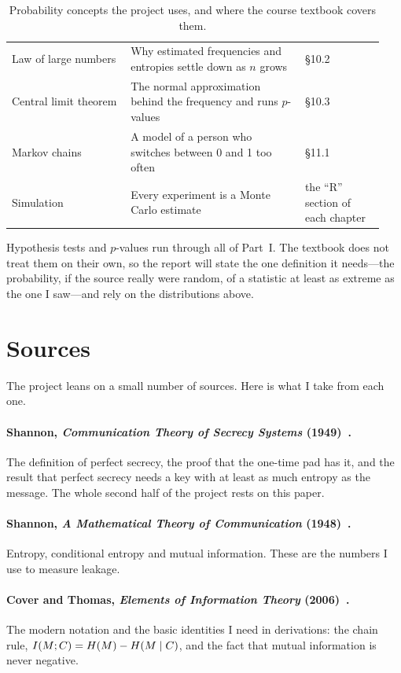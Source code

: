 \begin{table}[htbp]
\begin{tabular}{@{}>{\raggedright\arraybackslash}p{0.30\linewidth}>{\raggedright\arraybackslash}p{0.44\linewidth}>{\raggedright\arraybackslash}p{0.20\linewidth}@{}}
    Law of large numbers
      & Why estimated frequencies and entropies settle down as $n$ grows
      & \S10.2 \\
    Central limit theorem
      & The normal approximation behind the frequency and runs $p$-values
      & \S10.3 \\
    Markov chains
      & A model of a person who switches between 0 and 1 too often
      & \S11.1 \\
    Simulation
      & Every experiment is a Monte Carlo estimate
      & the ``R'' section of each chapter \\
    \bottomrule
  \end{tabular}
  \caption{Probability concepts the project uses, and where the course
    textbook covers them.}
  \label{tab:topics}
\end{table}

Hypothesis tests and $p$-values run through all of Part~I. The textbook does
not treat them on their own, so the report will state the one definition it
needs---the probability, if the source really were random, of a statistic at
least as extreme as the one I saw---and rely on the distributions above.

\section{Sources}\label{sec:sources}

The project leans on a small number of sources. Here is what I take from
each one.

\paragraph{Shannon, \emph{Communication Theory of Secrecy Systems}
  (1949)~\cite{shannon1949}.}
The definition of perfect secrecy, the proof that the one-time pad has it,
and the result that perfect secrecy needs a key with at least as much entropy
as the message. The whole second half of the project rests on this paper.

\paragraph{Shannon, \emph{A Mathematical Theory of Communication}
  (1948)~\cite{shannon1948}.}
Entropy, conditional entropy and mutual information. These are the numbers I
use to measure leakage.

\paragraph{Cover and Thomas, \emph{Elements of Information Theory}
  (2006)~\cite{cover2006}.}
The modern notation and the basic identities I need in derivations: the chain
rule, $I\!\left(M ; C\right) = H\!\left(M\right) - H\!\left(M \mid C\right)$, and the fact that
mutual information is never negative.

